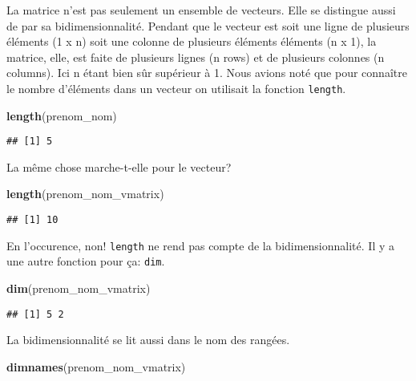 \documentclass[]{book}
\newenvironment{Shaded}{\begin{snugshade}}{\end{snugshade}}
\newcommand{\KeywordTok}[1]{\textcolor[rgb]{0.13,0.29,0.53}{\textbf{#1}}}
\newcommand{\NormalTok}[1]{#1}
\begin{document}
La matrice n'est pas seulement un ensemble de vecteurs. Elle se
distingue aussi de par sa bidimensionnalité. Pendant que le vecteur est
soit une ligne de plusieurs éléments (1 x n) soit une colonne de
plusieurs éléments éléments (n x 1), la matrice, elle, est faite de
plusieurs lignes (n rows) et de plusieurs colonnes (n columns). Ici n
étant bien sûr supérieur à 1. Nous avions noté que pour connaître le
nombre d'éléments dans un vecteur on utilisait la fonction
\texttt{length}.

\begin{Shaded}
\begin{Highlighting}[]
\KeywordTok{length}\NormalTok{(prenom_nom)}
\end{Highlighting}
\end{Shaded}

\begin{verbatim}
## [1] 5
\end{verbatim}

La même chose marche-t-elle pour le vecteur?

\begin{Shaded}
\begin{Highlighting}[]
\KeywordTok{length}\NormalTok{(prenom_nom_vmatrix)}
\end{Highlighting}
\end{Shaded}

\begin{verbatim}
## [1] 10
\end{verbatim}

En l'occurence, non! \texttt{length} ne rend pas compte de la
bidimensionnalité. Il y a une autre fonction pour ça: \texttt{dim}.

\begin{Shaded}
\begin{Highlighting}[]
\KeywordTok{dim}\NormalTok{(prenom_nom_vmatrix)}
\end{Highlighting}
\end{Shaded}

\begin{verbatim}
## [1] 5 2
\end{verbatim}

La bidimensionnalité se lit aussi dans le nom des rangées.

\begin{Shaded}
\begin{Highlighting}[]
\KeywordTok{dimnames}\NormalTok{(prenom_nom_vmatrix)}
\end{Highlighting}
\end{Shaded}
\end{document}
